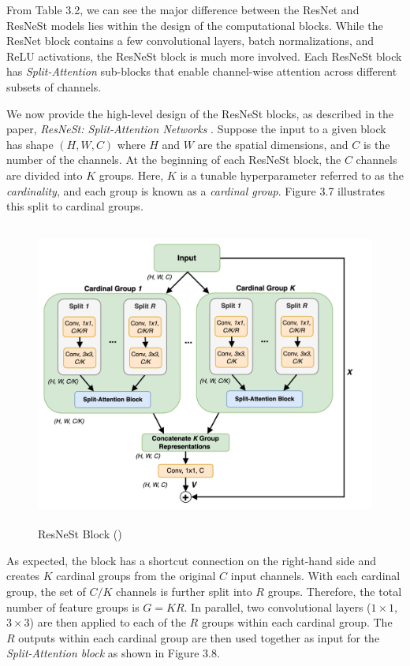 \documentclass [MAS] {uclathes}
\begin{document}
From Table 3.2, we can see the major difference between the ResNet and ResNeSt models lies within the design of the computational blocks. While the ResNet block contains a few convolutional layers, batch normalizations, and ReLU activations, the ResNeSt block is much more involved. Each ResNeSt block has \textit{Split-Attention} sub-blocks that enable channel-wise attention across different subsets of channels. 

We now provide the high-level design of the ResNeSt blocks, as described in the paper, \textit{ResNeSt: Split-Attention Networks} \cite{resnest}. Suppose the input to a given block has shape $(H, W, C)$ where $H$ and $W$ are the spatial dimensions, and $C$ is the number of the channels. At the beginning of each ResNeSt block, the $C$ channels are divided into $K$ groups. Here, $K$ is a tunable hyperparameter referred to as the \textit{cardinality}, and each group is known as a \textit{cardinal group}. Figure 3.7 illustrates this split to cardinal groups.

\begin{figure}[h]
\centering
\includegraphics[height = 100mm, width= 130mm]{imgs/resnest_block.png}
\caption{ResNeSt Block (\cite{resnest})}
\label{fig:resnest_block}
\end{figure}

As expected, the block has a shortcut connection on the right-hand side and creates $K$ cardinal groups from the original $C$ input channels. With each cardinal group, the set of $C/K$ channels is further split into $R$ groups. Therefore, the total number of feature groups is $G = KR$. In parallel, two convolutional layers ($1 \times 1$, $3 \times 3$) are then applied to each of the $R$ groups within each cardinal group. The $R$ outputs within each cardinal group are then used together as input for the \textit{Split-Attention block} as shown in Figure 3.8.
\end{document}
